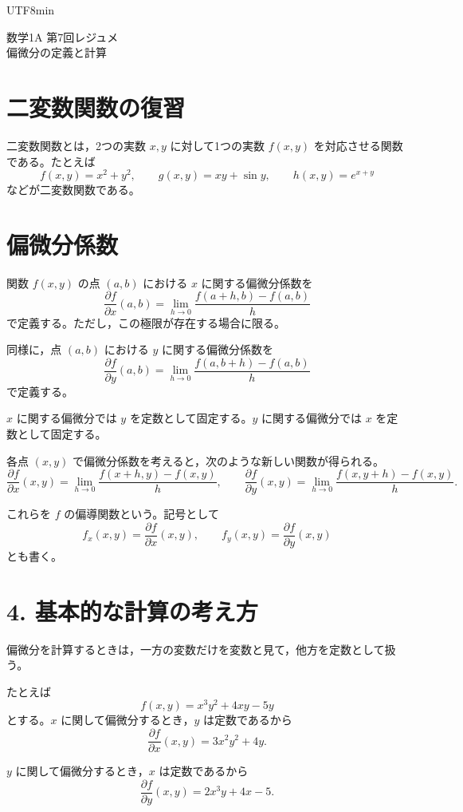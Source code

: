 \documentclass[a4paper,12pt]{article}
\begin{document}
\ifPDFTeX
\begin{CJK}{UTF8}{min}
\fi

\begin{center}
{\LARGE 数学1A 第7回レジュメ}\\[0.4em]
偏微分の定義と計算
\end{center}


\section{二変数関数の復習}

二変数関数とは，2つの実数 $x,y$ に対して1つの実数 $f(x,y)$ を対応させる関数である。たとえば
\[
f(x,y)=x^2+y^2,\qquad
g(x,y)=xy+\sin y,\qquad
h(x,y)=e^{x+y}
\]
などが二変数関数である。


\section{偏微分係数}

関数 $f(x,y)$ の点 $(a,b)$ における $x$ に関する偏微分係数を
\[
\frac{\partial f}{\partial x}(a,b)
=\lim_{h\to 0}\frac{f(a+h,b)-f(a,b)}{h}
\]
で定義する。ただし，この極限が存在する場合に限る。

同様に，点 $(a,b)$ における $y$ に関する偏微分係数を
\[
\frac{\partial f}{\partial y}(a,b)
=\lim_{h\to 0}\frac{f(a,b+h)-f(a,b)}{h}
\]
で定義する。

$x$ に関する偏微分では $y$ を定数として固定する。$y$ に関する偏微分では $x$ を定数として固定する。

各点 $(x,y)$ で偏微分係数を考えると，次のような新しい関数が得られる。
\[
\frac{\partial f}{\partial x}(x,y)
=\lim_{h\to 0}\frac{f(x+h,y)-f(x,y)}{h},
\qquad
\frac{\partial f}{\partial y}(x,y)
=\lim_{h\to 0}\frac{f(x,y+h)-f(x,y)}{h}.
\]

これらを $f$ の偏導関数という。記号として
\[
f_x(x,y)=\frac{\partial f}{\partial x}(x,y),
\qquad
f_y(x,y)=\frac{\partial f}{\partial y}(x,y)
\]
とも書く。


\section*{4. 基本的な計算の考え方}

偏微分を計算するときは，一方の変数だけを変数と見て，他方を定数として扱う。

たとえば
\[
f(x,y)=x^3y^2+4xy-5y
\]
とする。$x$ に関して偏微分するとき，$y$ は定数であるから
\[
\frac{\partial f}{\partial x}(x,y)
=3x^2y^2+4y.
\]

$y$ に関して偏微分するとき，$x$ は定数であるから
\[
\frac{\partial f}{\partial y}(x,y)
=2x^3y+4x-5.
\]
\ifPDFTeX
\end{CJK}
\fi
\end{document}
